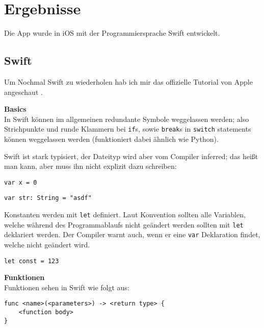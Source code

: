 
\section{Ergebnisse}
\label{sec:Ergebnisse}

Die App wurde in iOS mit der Programmiersprache Swift entwickelt.

\subsection{Swift}
\label{sec:Swift}

Um Nochmal Swift zu wiederholen hab ich mir das offizielle Tutorial von Apple angeschaut \cite{swift-tutorial}.


\textbf{Basics} \\
In Swift können im allgemeinen redundante Symbole weggelassen werden; also Strichpunkte und runde Klammern bei \texttt{if}s, sowie \texttt{break}s in \texttt{switch} statements können weggelassen werden (funktioniert dabei ähnlich wie Python).

Swift ist stark typisiert, der Dateityp wird aber vom Compiler inferred; das heißt man kann, aber muss ihn nicht explizit dazu schreiben:

\begin{lstlisting}[caption=Normale Variablendefinition]
var x = 0
\end{lstlisting}

\begin{lstlisting}[caption=Variablendefinition mit definiertem Datentyp]
var str: String = "asdf"
\end{lstlisting}

Konstanten werden mit \texttt{let} definiert. Laut Konvention sollten alle Variablen, welche während des Programmablaufs nicht geändert werden sollten mit \texttt{let} deklariert werden.
Der Compiler warnt auch, wenn er eine \texttt{var} Deklaration findet, welche nicht geändert wird.

\begin{lstlisting}[caption=Definition einer Konstanten]
let const = 123
\end{lstlisting}


\textbf{Funktionen} \\
Funktionen sehen in Swift wie folgt aus:

\begin{lstlisting}[caption=Allgemeine Funktionsdefinition]
func <name>(<parameters>) -> <return type> {
    <function body>
}
\end{lstlisting}

